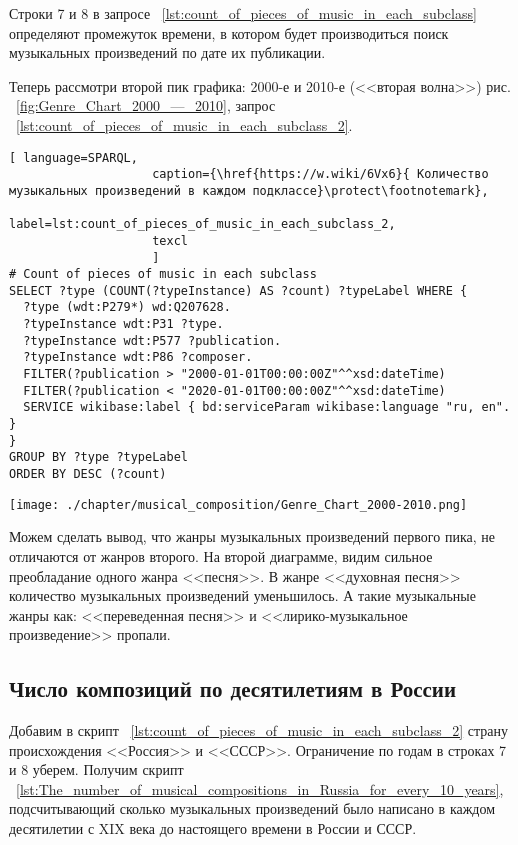 Строки 7 и 8 в запросе ~\ref{lst:count_of_pieces_of_music_in_each_subclass} определяют промежуток времени, в котором будет производиться поиск музыкальных произведений по дате их публикации.


Теперь рассмотри второй пик графика: 2000-е и 2010-е (<<вторая волна>>) рис. ~\ref{fig:Genre_Chart_2000_—_2010}, запрос ~\ref{lst:count_of_pieces_of_music_in_each_subclass_2}.

\begin{lstlisting}[ language=SPARQL,
                    caption={\href{https://w.wiki/6Vx6}{ Количество музыкальных произведений в каждом подклассе}\protect\footnotemark},
                    label=lst:count_of_pieces_of_music_in_each_subclass_2,
                    texcl 
                    ]
# Count of pieces of music in each subclass
SELECT ?type (COUNT(?typeInstance) AS ?count) ?typeLabel WHERE {
  ?type (wdt:P279*) wd:Q207628.
  ?typeInstance wdt:P31 ?type.
  ?typeInstance wdt:P577 ?publication.
  ?typeInstance wdt:P86 ?composer.
  FILTER(?publication > "2000-01-01T00:00:00Z"^^xsd:dateTime)        
  FILTER(?publication < "2020-01-01T00:00:00Z"^^xsd:dateTime)
  SERVICE wikibase:label { bd:serviceParam wikibase:language "ru, en". }
}
GROUP BY ?type ?typeLabel
ORDER BY DESC (?count)
\end{lstlisting}%

\begin{marginfigure}[0\baselineskip]
	\texttt{[image: ./chapter/musical\_composition/Genre\_Chart\_2000-2010.png]}
	\caption[Круговая диаграмма музыкальных жанров за 2000-2010 годы во всем мире]{Круговая диаграмма музыкальных жанров за 2000-2010 годы во всем мире. Ссылка на SPARQL-запрос: \href{https://w.wiki/6Vx6}{https://w.wiki/6Vx6}.}%
	\label{fig:Genre_Chart_2000_—_2010}%
\end{marginfigure}

Можем сделать вывод, что жанры музыкальных произведений первого пика, не отличаются от жанров второго. На второй диаграмме, видим сильное преобладание одного жанра <<песня>>. В жанре <<духовная песня>> количество музыкальных произведений уменьшилось. А такие музыкальные жанры как: <<переведенная песня>> и <<лирико-музыкальное произведение>> пропали.

\subsection{Число композиций по десятилетиям в России}
Добавим в скрипт ~\ref{lst:count_of_pieces_of_music_in_each_subclass_2} страну происхождения <<Россия>> и <<СССР>>. Ограничение по годам в строках 7 и 8 уберем. Получим скрипт ~\ref{lst:The_number_of_musical_compositions_in_Russia_for_every_10_years}, подсчитывающий сколько музыкальных произведений было написано в каждом десятилетии с XIX века до настоящего времени в России и СССР.

